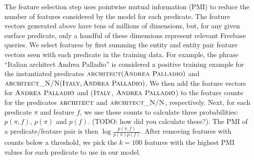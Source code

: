 \documentclass[11pt]{article}
\newcommand{\predicate}[1]{\ensuremath{\textsc{#1}}}
\newcommand{\entity}[1]{\ensuremath{\textsc{#1}}}
\begin{document}
% 


The feature selection step uses pointwise mutual information (PMI) to
reduce the number of features considered by the model for each
predicate. The feature vectors generated above have tens of millions
of dimensions, but, for any given surface predicate, only a handful of
these dimensions represent relevant Freebase queries. We select
features by first summing the entity and entity pair feature vectors
seen with each predicate in the training data. For example, the phrase
``Italian architect Andrea Palladio'' is considered a positive
training example for the instantiated predicates
$\predicate{architect}(\entity{Andrea Palladio})$ and
$\predicate{architect\_N/N}(\entity{Italy}, \entity{Andrea
  Palladio})$. We then add the feature vectors for \entity{Andrea
  Palladio} and (\entity{Italy}, \entity{Andrea Palladio}) to the
feature counts for the predicates \predicate{architect} and
\predicate{architect\_N/N}, respectively. Next, for each predicate
$\pi$ and feature $f$, we use these counts to calculate three
probabilities: $p(\pi, f)$, $p(\pi)$ and $p(f)$. (TODO: how did you
calculate these?). The PMI of a predicate/feature pair is then $\log
\frac{p(\pi, f)}{p(\pi)p(f)}$. After removing features with counts
below a threshold, we pick the $k=100$ features with the highest PMI
values for each predicate to use in our model.
\end{document}
